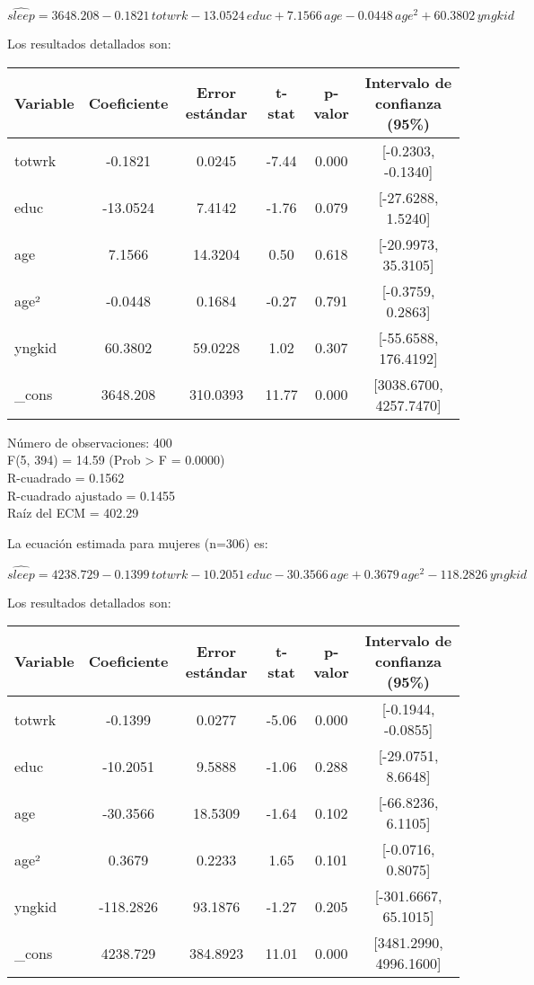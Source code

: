 \documentclass[12pt]{article}
\begin{document}
\[
\widehat{sleep} = 3648.208 - 0.1821 \, totwrk - 13.0524 \, educ + 7.1566 \, age - 0.0448 \, age^2 + 60.3802 \, yngkid
\]

Los resultados detallados son:

\begin{center}
\begin{tabular}{l c c c c c}
\toprule
Variable & Coeficiente & Error estándar & t-stat & p-valor & Intervalo de confianza (95\%) \\
\midrule
totwrk & -0.1821 & 0.0245 & -7.44 & 0.000 & [-0.2303, -0.1340] \\
educ & -13.0524 & 7.4142 & -1.76 & 0.079 & [-27.6288, 1.5240] \\
age & 7.1566 & 14.3204 & 0.50 & 0.618 & [-20.9973, 35.3105] \\
age² & -0.0448 & 0.1684 & -0.27 & 0.791 & [-0.3759, 0.2863] \\
yngkid & 60.3802 & 59.0228 & 1.02 & 0.307 & [-55.6588, 176.4192] \\
\_cons & 3648.208 & 310.0393 & 11.77 & 0.000 & [3038.6700, 4257.7470] \\
\bottomrule
\end{tabular}
\end{center}

Número de observaciones: 400 \\
F(5, 394) = 14.59 (Prob > F = 0.0000) \\
R-cuadrado = 0.1562 \\
R-cuadrado ajustado = 0.1455 \\
Raíz del ECM = 402.29

La ecuación estimada para mujeres (n=306) es:

\[
\widehat{sleep} = 4238.729 - 0.1399 \, totwrk - 10.2051 \, educ - 30.3566 \, age + 0.3679 \, age^2 - 118.2826 \, yngkid
\]

Los resultados detallados son:

\begin{center}
\begin{tabular}{l c c c c c}
\toprule
Variable & Coeficiente & Error estándar & t-stat & p-valor & Intervalo de confianza (95\%) \\
\midrule
totwrk & -0.1399 & 0.0277 & -5.06 & 0.000 & [-0.1944, -0.0855] \\
educ & -10.2051 & 9.5888 & -1.06 & 0.288 & [-29.0751, 8.6648] \\
age & -30.3566 & 18.5309 & -1.64 & 0.102 & [-66.8236, 6.1105] \\
age² & 0.3679 & 0.2233 & 1.65 & 0.101 & [-0.0716, 0.8075] \\
yngkid & -118.2826 & 93.1876 & -1.27 & 0.205 & [-301.6667, 65.1015] \\
\_cons & 4238.729 & 384.8923 & 11.01 & 0.000 & [3481.2990, 4996.1600] \\
\bottomrule
\end{tabular}
\end{center}
\end{document}
